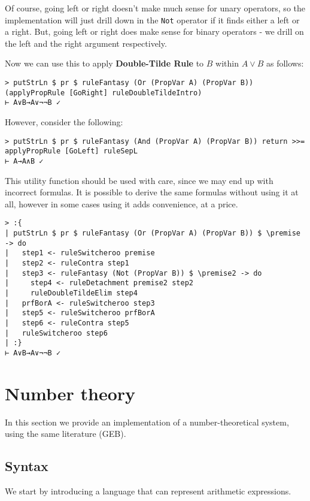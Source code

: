\documentclass{article}
\begin{document}
Of course, going left or right doesn't make much sense for unary operators, so the implementation will just drill down in the \texttt{Not} operator if it finds either a left or a right. But, going left or right does make sense for binary operators - we drill on the left and the right argument respectively.

Now we can use this to apply \textbf{Double-Tilde Rule} to $B$ within $A \lor B$ as follows:

\begin{lstlisting}
> putStrLn $ pr $ ruleFantasy (Or (PropVar A) (PropVar B)) (applyPropRule [GoRight] ruleDoubleTildeIntro)
⊢ A∨B→A∨¬¬B ✓
\end{lstlisting}

However, consider the following:

\begin{lstlisting}
> putStrLn $ pr $ ruleFantasy (And (PropVar A) (PropVar B)) return >>= applyPropRule [GoLeft] ruleSepL
⊢ A→A∧B ✓
\end{lstlisting}

This utility function should be used with care, since we may end up with incorrect formulas. It is possible to derive the same formulas without using it at all, however in some cases using it adds convenience, at a price.

\begin{lstlisting}
> :{
| putStrLn $ pr $ ruleFantasy (Or (PropVar A) (PropVar B)) $ \premise -> do
|   step1 <- ruleSwitcheroo premise
|   step2 <- ruleContra step1
|   step3 <- ruleFantasy (Not (PropVar B)) $ \premise2 -> do
|     step4 <- ruleDetachment premise2 step2
|     ruleDoubleTildeElim step4
|   prfBorA <- ruleSwitcheroo step3
|   step5 <- ruleSwitcheroo prfBorA
|   step6 <- ruleContra step5
|   ruleSwitcheroo step6
| :}
⊢ A∨B→A∨¬¬B ✓
\end{lstlisting}

\section{Number theory}

In this section we provide an implementation of a number-theoretical system, using the same literature (GEB).

\subsection{Syntax}

We start by introducing a language that can represent arithmetic expressions.
\end{document}
